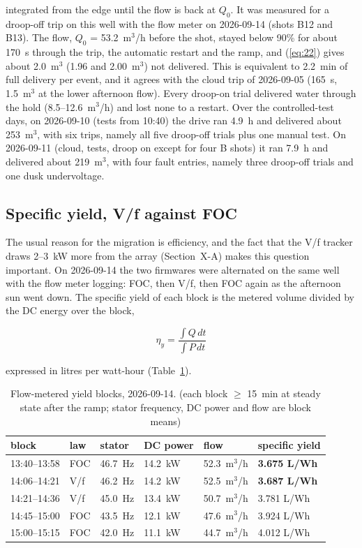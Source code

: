 \documentclass[journal]{IEEEtran}
\begin{document}
integrated from the edge until the flow is back at $Q_0$. It was measured for a droop-off trip on this well with the flow meter on 2026-09-14 (shots B12 and B13). The flow, $Q_0$ = 53.2~m$^{3}$/h before the shot, stayed below 90\% for about 170~s through the trip, the automatic restart and the ramp, and (\ref{eq:22}) gives about 2.0~m$^{3}$ (1.96 and 2.00~m$^{3}$) not delivered. This is equivalent to 2.2~min of full delivery per event, and it agrees with the cloud trip of 2026-09-05 (165~s, 1.5~m$^{3}$ at the lower afternoon flow). Every droop-on trial delivered water through the hold (8.5--12.6~m$^{3}$/h) and lost none to a restart. Over the controlled-test days, on 2026-09-10 (tests from 10:40) the drive ran 4.9~h and delivered about 253~m$^{3}$, with six trips, namely all five droop-off trials plus one manual test. On 2026-09-11 (cloud, tests, droop on except for four B shots) it ran 7.9~h and delivered about 219~m$^{3}$, with four fault entries, namely three droop-off trials and one dusk undervoltage.

\subsection{Specific yield, V/f against FOC}

The usual reason for the migration is efficiency, and the fact that the V/f tracker draws 2--3~kW more from the array (Section~X-A) makes this question important. On 2026-09-14 the two firmwares were alternated on the same well with the flow meter logging: FOC, then V/f, then FOC again as the afternoon sun went down. The specific yield of each block is the metered volume divided by the DC energy over the block,

\begin{equation}
\eta_y = \frac{\int Q\,dt}{\int P\,dt}
\label{eq:23}
\end{equation}

expressed in litres per watt-hour (Table~\ref{tab:5}).

\begin{table}[!t]\caption{Flow-metered yield blocks, 2026-09-14. (each block $\ge$ 15~min at steady state after the ramp; stator frequency, DC power and flow are block means)}\label{tab:5}\centering\scriptsize
\begin{tabularx}{\columnwidth}{llXXXX}\toprule
block & law & stator & DC power & flow & specific yield \\
\midrule
13:40--13:58 & FOC & 46.7~Hz & 14.2~kW & 52.3~m$^{3}$/h & \textbf{3.675 L/Wh} \\
14:06--14:21 & V/f & 46.2~Hz & 14.2~kW & 52.5~m$^{3}$/h & \textbf{3.687 L/Wh} \\
14:21--14:36 & V/f & 45.0~Hz & 13.4~kW & 50.7~m$^{3}$/h & 3.781 L/Wh \\
14:45--15:00 & FOC & 43.5~Hz & 12.1~kW & 47.6~m$^{3}$/h & 3.924 L/Wh \\
15:00--15:15 & FOC & 42.0~Hz & 11.1~kW & 44.7~m$^{3}$/h & 4.012 L/Wh \\
\bottomrule\end{tabularx}\end{table}
\end{document}
